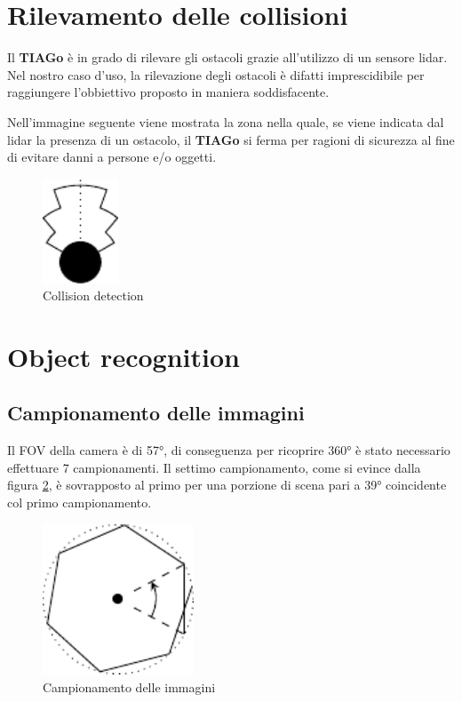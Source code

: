 \documentclass[a4paper]{article}
\begin{document}
	
	\section{Rilevamento delle collisioni}\label{sec:Rilevamento-delle-collisioni} 
	Il \textbf{TIAGo} è in grado di rilevare gli ostacoli grazie all'utilizzo di un sensore lidar. Nel nostro caso d'uso, la rilevazione degli ostacoli è difatti imprescidibile per raggiungere l'obbiettivo proposto in maniera soddisfacente. 
	
	Nell'immagine seguente viene mostrata la zona nella quale, se viene indicata dal lidar la presenza di un ostacolo, il \textbf{TIAGo} si ferma per ragioni di sicurezza al fine di evitare danni a persone e/o oggetti.
	\begin{figure}[H]
		\centering
		\includegraphics[width=0.2\textwidth]{./img/collision_detection.pdf}
		\caption{Collision detection}
		\label{fig:collision_detection}
	\end{figure}
	
	\section{Object recognition}\label{sec:Object-recognition}
	
	\subsection{Campionamento delle immagini}\label{subsec:Campionamento-delle-immagini}
	Il FOV della camera è di 57°, di conseguenza per ricoprire 360° è stato necessario effettuare 7 campionamenti. Il settimo campionamento, come si evince dalla figura \ref{fig:campionamento_immagini}, è sovrapposto al primo per una porzione di scena pari a 39° coincidente col primo campionamento.
	
	\begin{figure}[H]
		\centering
		\includegraphics[width=0.4\textwidth]{./img/pictures_sampling.pdf}
		\caption{Campionamento delle immagini}
		\label{fig:campionamento_immagini}
	\end{figure}
	
\end{document}
